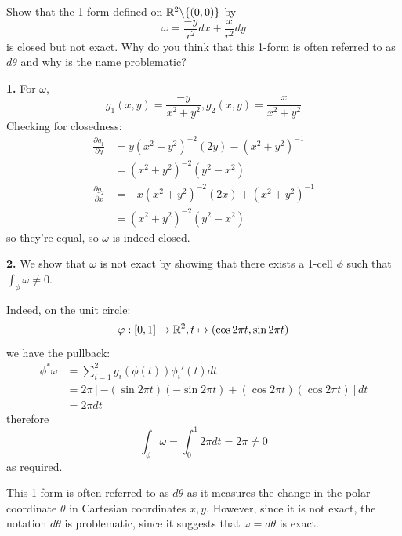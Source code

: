 \documentclass[a4paper, 12pt]{article}
\begin{document}
\begin{problem} 
Show that the 1-form defined on $\mathbb{R}^2 \backslash \{(0, 0)\}$ by \[
    \omega = \frac{-y}{r^2} dx + \frac{x}{r^2}dy
\]
is closed but not exact. Why do you think that this 1-form is often referred to as $d\theta$ and why is the name problematic?
\end{problem}
\begin{solution}
    \textbf{1.} 
    For $\omega$,
    \[
         g_1(x, y) = \frac{-y}{x^2 + y^2}, g_2(x, y) = \frac{x}{x^2 + y^2}
    \]
    Checking for closedness:
    \begin{align*}
    \frac{\partial g_1}{\partial y} &= y(x^2 + y^2)^{-2}(2y) - (x^2 + y^2)^{-1} \\
    &= (x^2 + y^2)^{-2}(y^2 - x^2) \\
    \frac{\partial g_2}{\partial x} &= -x(x^2 + y^2)^{-2}(2x) + (x^2 + y^2)^{-1} \\
    &= (x^2 + y^2)^{-2}(y^2 - x^2)
    \end{align*}
    so they're equal, so $\omega$ is indeed closed.

    \textbf{2.} We show that $\omega$ is not exact by showing that there exists a 1-cell $\phi$ such that $\int_{\phi} \omega \neq 0$.

    Indeed, on the unit circle: \[
    \varphi: [0, 1] \to \mathbb{R}^2, t \mapsto (\cos 2\pi t, \sin 2 \pi t)
    \]
    we have the pullback:
    \begin{align*}
        \phi^*\omega &= \sum_{i=1}^{2} g_i (\phi(t)) \phi_i'(t) dt \\
        &= 2\pi[-(\sin 2\pi t)(- \sin 2 \pi t) + (\cos 2\pi t)(\cos 2\pi t)] dt \\
        &= 2\pi dt
    \end{align*}
    therefore \[
    \int_{\phi} \omega = \int_{0}^{1} 2\pi dt = 2\pi \neq 0
    \]
    as required.

    This 1-form is often referred to as $d\theta$ as it measures the change in the polar coordinate $\theta$ in Cartesian coordinates $x, y$. However, since it is not exact, the notation $d\theta$ is problematic, since it suggests that $\omega = d\theta$ is exact.
\end{solution}
\end{document}
